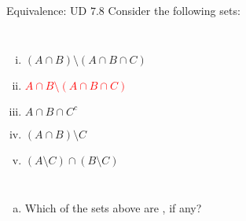 \begin{frame}{}
  \begin{exampleblock}{Equivalence: UD $7.8$}
    Consider the following sets:
    \begin{columns}
	\begin{enumerate}[(i)]
	  \item $(A \cap B) \setminus (A \cap B \cap C)$
	  \item \textcolor<2->{red}{$A \cap B \setminus (A \cap B \cap C)$}
	  \item $A \cap B \cap C^{c}$
	  \item $(A \cap B) \setminus C$
	  \item $(A \setminus C) \cap (B \setminus C)$
	\end{enumerate}
    \end{columns}

    \begin{enumerate}[(a)]
      \item Which of the sets above are , if any?
    \end{enumerate}
  \end{exampleblock}


  \vspace{-0.80cm}

  \vspace{-0.30cm}
\end{frame}

